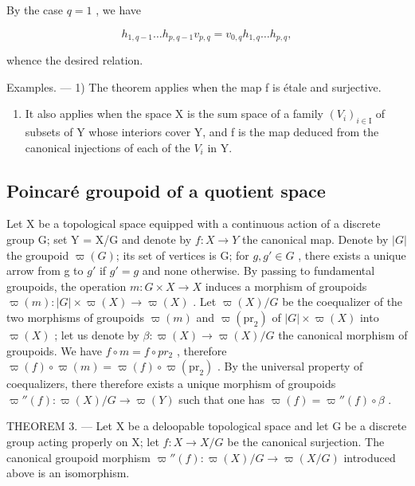 By the case \(q = 1\) , we have

\[
h _ {1, q - 1} \dots h _ {p, q - 1} v _ {p, q} = v _ {0, q} h _ {1, q} \dots h _ {p, q},
\]

whence the desired relation.

Examples. --- 1) The theorem applies when the map f is étale and surjective.

\begin{enumerate}
\def\labelenumi{\arabic{enumi})}
\setcounter{enumi}{1}
\tightlist
\item
  It also applies when the space X is the sum space of a family \((V_{i})_{i\in\mathrm{I}}\) of subsets of Y whose interiors cover Y, and f is the map deduced from the canonical injections of each of the \(V_{i}\) in Y.
\end{enumerate}

\subsection{Poincaré groupoid of a quotient space}

Let X be a topological space equipped with a continuous action of a discrete group G; set Y = X/G and denote by \(f: X \to Y\) the canonical map. Denote by \(\lvert G\rvert\) the groupoid \(\varpi(G)\); its set of vertices is G; for \(g, g' \in G\) , there exists a unique arrow from g to \(g'\) if \(g' = g\) and none otherwise. By passing to fundamental groupoids, the operation \(m: G \times X \to X\) induces a morphism of groupoids \(\varpi(m): \lvert G\rvert \times \varpi(X) \to \varpi(X)\) . Let \(\varpi(X)/G\) be the coequalizer of the two morphisms of groupoids \(\varpi(m)\) and \(\varpi(\mathrm{pr}_{2})\) of \(\lvert G\rvert \times \varpi(X)\) into \(\varpi(X)\) ; let us denote by \(\beta: \varpi(X) \to \varpi(X)/G\) the canonical morphism of groupoids. We have \(f \circ m = f \circ pr_{2}\) , therefore \(\varpi(f) \circ \varpi(m) = \varpi(f) \circ \varpi(\mathrm{pr}_{2})\) . By the universal property of coequalizers, there therefore exists a unique morphism of groupoids \(\varpi''(f): \varpi(X)/G \to \varpi(Y)\) such that one has \(\varpi(f) = \varpi''(f) \circ \beta\) .

THEOREM 3. --- Let X be a deloopable topological space and let G be a discrete group acting properly on X; let \(f\colon X \to X/G\) be the canonical surjection. The canonical groupoid morphism \(\varpi''(f)\colon \varpi(X)/G \to \varpi(X/G)\) introduced above is an isomorphism.

